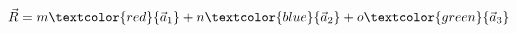 \documentclass[preview]{standalone}
\begin{document}
\begin{align*}
\vec{R} = m \textcolor{red}{\vec{a}_1} + n \textcolor{blue}{\vec{a}_2} + o \textcolor{green}{\vec{a}_3}
\end{align*}
\end{document}
